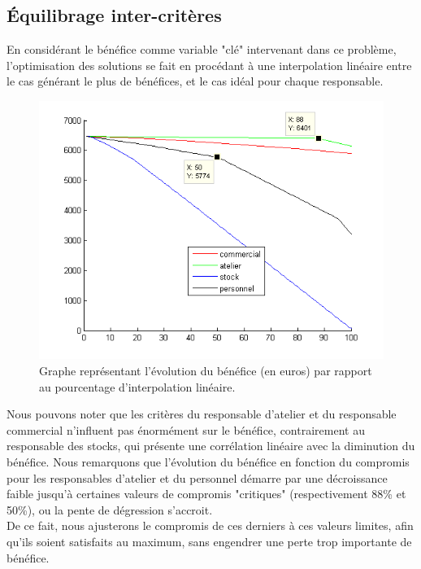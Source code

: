 \subsection{Équilibrage inter-critères}

En considérant le bénéfice comme variable "clé" intervenant dans ce problème,
l'optimisation des solutions se fait en procédant à une interpolation linéaire
entre le cas générant le plus de bénéfices, et le cas idéal pour chaque
responsable. \\

\begin{figure}
    \begin{center}
        \includegraphics{partie2/graph_multi.png}
        \caption{Graphe représentant l'évolution du bénéfice (en euros) par
        rapport au pourcentage d'interpolation linéaire.}
    \end{center}
\end{figure}

Nous pouvons noter que les critères du responsable d'atelier et du responsable
commercial n'influent pas énormément sur le bénéfice, contrairement au
responsable des stocks, qui présente une corrélation linéaire avec la
diminution du bénéfice.
Nous remarquons que l'évolution du bénéfice en fonction du compromis pour les
responsables d'atelier et du personnel démarre par une décroissance faible
jusqu'à certaines valeurs de compromis "critiques" (respectivement 88\% et
50\%), ou la pente de dégression s'accroit. \\

De ce fait, nous ajusterons le compromis de ces derniers à ces valeurs limites,
afin qu'ils soient satisfaits au maximum, sans engendrer une perte trop
importante de bénéfice. \\

